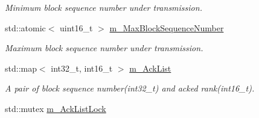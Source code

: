 \begin{DoxyCompactItemize}
\begin{DoxyCompactList}\small\item\em Minimum block sequence number under transmission. \end{DoxyCompactList}\item 
std\+::atomic$<$ uint16\+\_\+t $>$ \hyperlink{class_network_coding_1_1_transmission_session_ada3247219b3f08a5c65b1d804bfa976c}{m\+\_\+\+Max\+Block\+Sequence\+Number}\hypertarget{class_network_coding_1_1_transmission_session_ada3247219b3f08a5c65b1d804bfa976c}{}\label{class_network_coding_1_1_transmission_session_ada3247219b3f08a5c65b1d804bfa976c}

\begin{DoxyCompactList}\small\item\em Maximum block sequence number under transmission. \end{DoxyCompactList}\item 
std\+::map$<$ int32\+\_\+t, int16\+\_\+t $>$ \hyperlink{class_network_coding_1_1_transmission_session_aa7b466f696587e66d2a961701d552a6a}{m\+\_\+\+Ack\+List}\hypertarget{class_network_coding_1_1_transmission_session_aa7b466f696587e66d2a961701d552a6a}{}\label{class_network_coding_1_1_transmission_session_aa7b466f696587e66d2a961701d552a6a}

\begin{DoxyCompactList}\small\item\em A pair of block sequence number(int32\+\_\+t) and acked rank(int16\+\_\+t). \end{DoxyCompactList}\item 
std\+::mutex \hyperlink{class_network_coding_1_1_transmission_session_aa6c2b27cc410ad42e72f1daaec900600}{m\+\_\+\+Ack\+List\+Lock}\hypertarget{class_network_coding_1_1_transmission_session_aa6c2b27cc410ad42e72f1daaec900600}{}\label{class_network_coding_1_1_transmission_session_aa6c2b27cc410ad42e72f1daaec900600}


\end{DoxyCompactItemize}
